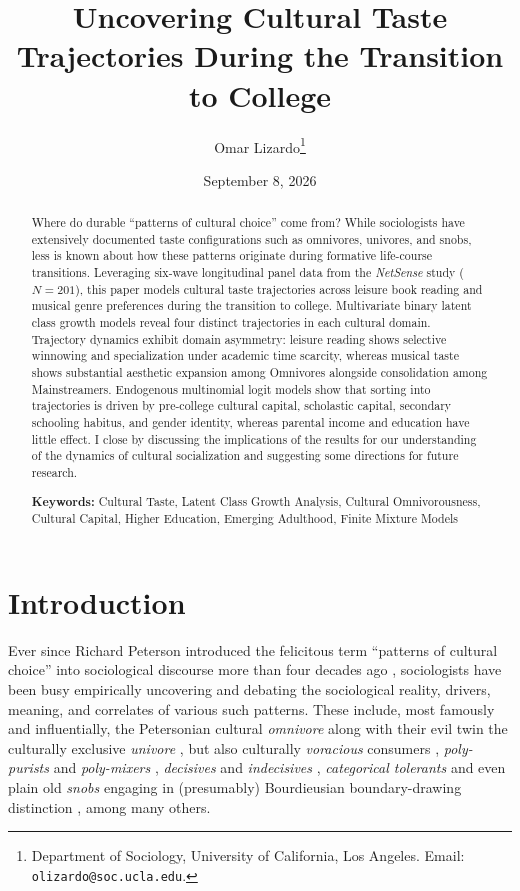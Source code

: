 \documentclass[12pt]{article}
\title{\textbf{Uncovering Cultural Taste Trajectories During the Transition to College}}
\author{
  Omar Lizardo\thanks{Department of Sociology, University of California, Los Angeles. Email: \texttt{olizardo@soc.ucla.edu}.}}
\date{September 8, 2026}
\begin{document}
\maketitle

\begin{abstract}
Where do durable ``patterns of cultural choice'' come from? While sociologists have extensively documented taste configurations such as omnivores, univores, and snobs, less is known about how these patterns originate during formative life-course transitions. Leveraging six-wave longitudinal panel data from the \textit{NetSense} study ($N = 201$), this paper models cultural taste trajectories across leisure book reading and musical genre preferences during the transition to college. Multivariate binary latent class growth models reveal four distinct trajectories in each cultural domain. Trajectory dynamics exhibit domain asymmetry: leisure reading shows selective winnowing and specialization under academic time scarcity, whereas musical taste shows substantial aesthetic expansion among Omnivores alongside consolidation among Mainstreamers. Endogenous multinomial logit models show that sorting into trajectories is driven by pre-college cultural capital, scholastic capital, secondary schooling habitus, and gender identity, whereas parental income and education have little effect. I close by discussing the implications of the results for our understanding of the dynamics of cultural socialization and suggesting some directions for future research. 

\vspace{0.8em}
\noindent\textbf{Keywords:} Cultural Taste, Latent Class Growth Analysis, Cultural Omnivorousness, Cultural Capital, Higher Education, Emerging Adulthood, Finite Mixture Models
\end{abstract}

\newpage

\section{Introduction}
Ever since Richard Peterson introduced the felicitous term ``patterns of cultural choice'' into sociological discourse more than four decades ago \citep{peterson1983patterns-f85}, sociologists have been busy empirically uncovering and debating the sociological reality, drivers, meaning, and correlates of various such patterns. These include, most famously and influentially, the Petersonian cultural \textit{omnivore} \citep{peterson1996changing-967, goldberg2011mapping-77a, warde2008omnivorous-e77} along with their evil twin the culturally exclusive \textit{univore} \citep{bryson1997what-933, peterson1992understanding-ce3, tonkovi2025globallocal-96f}, but also culturally \textit{voracious} consumers \citep{sullivan2007omnivore-018}, \textit{poly-purists} and \textit{poly-mixers} \citep{goldberg2016what-4e3, poecke2018pure-873}, \textit{decisives} and \textit{indecisives} \citep{sonnett2004musical-961}, \textit{categorical tolerants} \citep{lizardo2026forward, lindblom2022growing-ded} and even plain old \textit{snobs} engaging in (presumably) Bourdieusian boundary-drawing distinction \citep{atkinson2011context-d44, nault2021social-1bf}, among many others.
\end{document}
